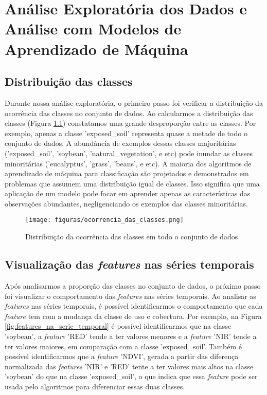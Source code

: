 \chapter{Análise Exploratória dos Dados e Análise com Modelos de Aprendizado de Máquina}

\section{Distribuição das classes}

Durante nossa análise exploratória, o primeiro passo foi verificar a distribuição da ocorrência das classes no conjunto de dados. Ao calcularmos a distribuição das classes (Figura \ref{fig:distribuicao_classes}) constatamos uma grande desproporção entre as classes. Por exemplo, apenas a classe 'exposed\_soil' representa quase a metade de todo o conjunto de dados. A abundância de exemplos dessas classes majoritárias ('exposed\_soil', 'soybean', 'natural\_vegetation', e etc) pode inundar as classes minoritárias ('eucalyptus', 'grass', 'beans', e etc). A maioria dos algoritmos de aprendizado de máquina para classificação são projetados e demonstrados em problemas que assumem uma distribuição igual de classes. Isso significa que uma aplicação de um modelo pode focar em aprender apenas as características das observações abundantes, negligenciando os exemplos das classes minoritárias.

\begin{figure}[H]
\caption{Distribuição da ocorrência das classes em todo o conjunto de dados.}
\label{fig:distribuicao_classes}
\centering
\texttt{[image: figuras/ocorrencia\_das\_classes.png]}
\end{figure}


\section{Visualização das \textit{features} nas séries temporais}

Após analisarmos a proporção das classes no conjunto de dados, o próximo passo foi visualizar o comportamento das \textit{features} nas séries temporais. Ao analisar as \textit{features} nas séries temporais, é possível identificarmos o comportamento que cada \textit{feature} tem com a mudança da classe de uso e cobertura. Por exemplo, na Figura \ref{fig:features_na_serie_temporal} é possível identificarmos que na classe 'soybean', a \textit{feature} 'RED' tende a ter valores menores e a \textit{feature} 'NIR' tende a ter valores maiores, em comparação com a classe 'exposed\_soil'. Também é possível identificarmos que a \textit{feature} 'NDVI', gerada a partir das diferença normalizada das \textit{features} 'NIR' e 'RED' tente a ter valores mais altos na classe 'soybean' do que na classe 'exposed\_soil', o que indica que essa \textit{feature} pode ser usada pelo algoritmos para diferenciar essas duas classes.


